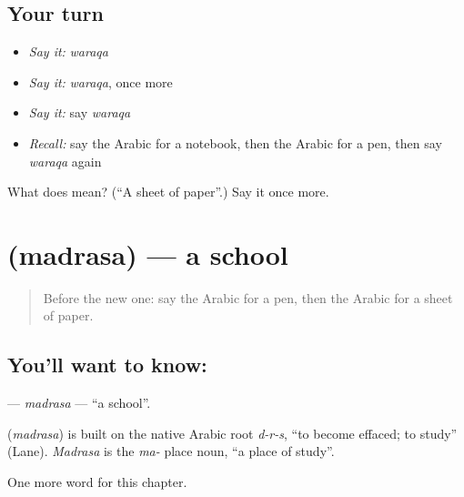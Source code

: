 \subsection*{Your turn}
\begin{itemize}
\raggedright
  \item \emph{Say it:} \emph{waraqa}
  \item \emph{Say it:} \emph{waraqa}, once more
  \item \emph{Say it:} say \emph{waraqa}
  \item \emph{Recall:} say the Arabic for a notebook, then the Arabic for a pen, then say \emph{waraqa} again
\end{itemize}

\begin{tcolorbox}[breakable,colback=teal!4,colframe=teal!35!black,title={Before you move on}]
What does  mean? (\textquotedblleft{}A sheet of paper\textquotedblright{}.) Say it once more.
\end{tcolorbox}
\section[\texorpdfstring{\ar{مدرسة} (madrasa)}{مدرسة (madrasa)}]{ (madrasa) — a school}

\label{lesson:AR-C73-madrasa}



\begin{quote}
Before the new one: say the Arabic for a pen, then the Arabic for a sheet of paper.
\end{quote}

\subsection*{You'll want to know: }
\textbf{} — \emph{madrasa} — \textquotedblleft{}a school\textquotedblright{}.

\begin{cousinweb}
\textbf{} (\emph{madrasa}) is built on the native Arabic root \emph{d-r-s}, \textquotedblleft{}to become effaced; to study\textquotedblright{} (Lane). \emph{Madrasa} is the \emph{ma-} place noun, \textquotedblleft{}a place of study\textquotedblright{}.
\end{cousinweb}

\begin{grammarlens}[title={What you've built}]
One more word for this chapter.
\end{grammarlens}


